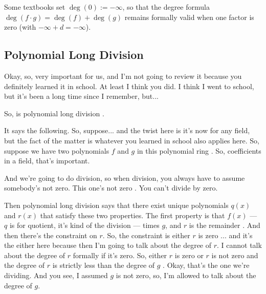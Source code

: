 \begin{aiNote}[Beyond the Lecture: The Convention $\deg(0) = -\infty$]
Some textbooks set $\deg(0) := -\infty$, so that the degree formula $\deg(f \cdot g) = \deg(f) + \deg(g)$ remains formally valid when one factor is zero (with $-\infty + d = -\infty$).
\end{aiNote}

\subsection{Polynomial Long Division}

\begin{speech}[00:27:36 - 00:29:16]
Okay, so, very important for us, and I'm not going to review it because you definitely learned it in school. At least I think you did. I think I went to school, but it's been a long time since I remember, but...

So, is polynomial long division .

It says the following. So, suppose... and the twist here is it's now for any field, but the fact of the matter is whatever you learned in school also applies here. So, suppose we have two polynomials $f$ and $g$ in this polynomial ring . So, coefficients in a field, that's important.

And we're going to do division, so when division, you always have to assume somebody's not zero. This one's not zero . You can't divide by zero.

Then polynomial long division says that there exist unique polynomials  $q(x)$ and $r(x)$  that satisfy these two properties. The first property is that $f(x)$ --- $q$ is for quotient, it's kind of the division --- times $g$, and $r$ is the remainder . And then there's the constraint on $r$. So, the constraint is either $r$ is zero ... and it's the either here because then I'm going to talk about the degree of $r$. I cannot talk about the degree of $r$ formally if it's zero. So, either $r$ is zero or $r$ is not zero  and the degree of $r$ is strictly less than the degree of $g$ . Okay, that's the one we're dividing. And you see, I assumed $g$ is not zero, so, I'm allowed to talk about the degree of $g$.
\end{speech}

